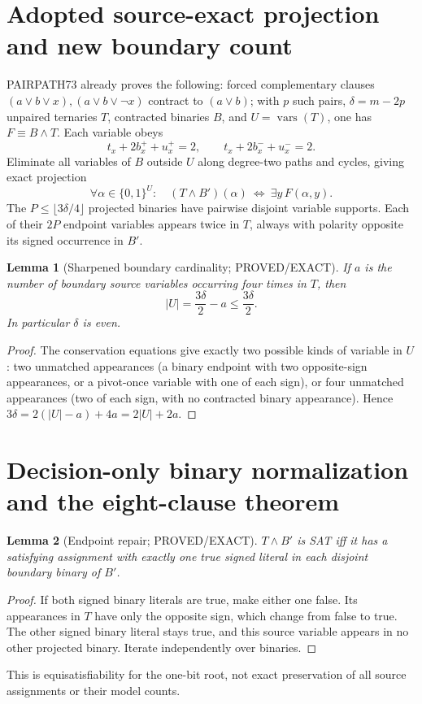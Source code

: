 \documentclass[11pt]{article}
\newtheorem{lemma}{Lemma}
\begin{document}
\section{Adopted source-exact projection and new boundary count}
PAIRPATH73 already proves the following: forced complementary clauses $(a\vee b\vee x),(a\vee b\vee\neg x)$ contract to $(a\vee b)$; with $p$ such pairs, $\delta=m-2p$ unpaired ternaries $T$, contracted binaries $B$, and $U=\operatorname{vars}(T)$, one has $F\equiv B\land T$. Each variable obeys
\[
t_x+2b_x^++u_x^+=2,\qquad t_x+2b_x^-+u_x^-=2.
\]
Eliminate all variables of $B$ outside $U$ along degree-two paths and cycles, giving exact projection
\[
\forall\alpha\in\{0,1\}^U:\quad (T\land B')(\alpha)\ \iff\ \exists y\,F(\alpha,y).
\]
The $P\le\lfloor3\delta/4\rfloor$ projected binaries have pairwise disjoint variable supports. Each of their $2P$ endpoint variables appears twice in $T$, always with polarity opposite its signed occurrence in $B'$.

\begin{lemma}[Sharpened boundary cardinality; PROVED/EXACT]
If $a$ is the number of boundary source variables occurring four times in $T$, then
\[
\boxed{|U|=\frac{3\delta}{2}-a\le\frac{3\delta}{2}.}
\]
In particular $\delta$ is even.
\end{lemma}
\begin{proof}
The conservation equations give exactly two possible kinds of variable in $U$: two unmatched appearances (a binary endpoint with two opposite-sign appearances, or a pivot-once variable with one of each sign), or four unmatched appearances (two of each sign, with no contracted binary appearance). Hence $3\delta=2(|U|-a)+4a=2|U|+2a$.
\end{proof}

\section{Decision-only binary normalization and the eight-clause theorem}
\begin{lemma}[Endpoint repair; PROVED/EXACT]
$T\land B'$ is SAT iff it has a satisfying assignment with exactly one true \emph{signed} literal in each disjoint boundary binary of $B'$.
\end{lemma}
\begin{proof}
If both signed binary literals are true, make either one false. Its appearances in $T$ have only the opposite sign, which change from false to true. The other signed binary literal stays true, and this source variable appears in no other projected binary. Iterate independently over binaries.
\end{proof}
This is equisatisfiability for the one-bit root, not exact preservation of all source assignments or their model counts.
\end{document}
